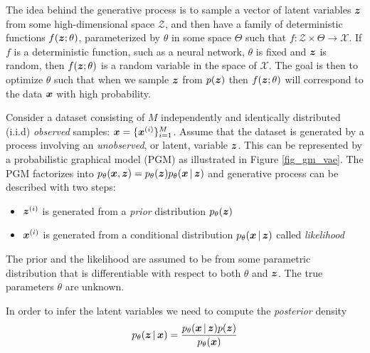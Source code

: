 

The idea behind the generative process is to sample a vector of latent variables $\boldsymbol{z}$ from some high-dimensional space $\mathcal{Z}$, and then have a family of deterministic functions $f(\boldsymbol{z};\theta)$, parameterized by $\theta$ in some space $\Theta$ such that $f: \mathcal{Z} \times \Theta \rightarrow \mathcal{X}$. If $f$ is a deterministic function, such as a neural network, $\theta$ is fixed and $\boldsymbol{z}$ is random, then $f(\boldsymbol{z};\theta)$ is a random variable in the space of $\mathcal{X}$. The goal is then to optimize $\theta$ such that when we sample $\boldsymbol{z}$ from $p(\boldsymbol{z})$ then $f(\boldsymbol{z};\theta)$ will correspond to the data $\boldsymbol{x}$ with high probability.

Consider a dataset consisting of $M$ independently and identically distributed (i.i.d) \textit{observed} samples: $\boldsymbol{x} = \{\boldsymbol{x}^{(i)}\}^M_{i=1}$. Assume that the dataset is generated by a process involving an \textit{unobserved}, or latent, variable $\boldsymbol{z}$. This can be represented by a probabilistic graphical model (PGM) as illustrated in Figure \ref{fig_gm_vae}. The PGM factorizes into $\ptheta (\vx, \vz) = \ptheta (\vz) \ptheta \given{\vx}{\vz}$ and generative process can be described with two steps:

\begin{itemize}
    \item $\boldsymbol{z}^{(i)}$ is generated from a \textit{prior} distribution $p_{\theta}(\boldsymbol{z})$
    \item $\boldsymbol{x}^{(i)}$ is generated from a conditional distribution $p_{\theta}\given{\vx}{\vz}$ called \textit{likelihood}
\end{itemize}
%
The prior and the likelihood are assumed to be from some parametric distribution that is differentiable with respect to both $\theta$ and $\boldsymbol{z}$. The true parameters $\theta$ are unknown.

In order to infer the latent variables we need to compute the \textit{posterior} density
\begin{equation}
p_{\theta}\given{\vz}{\vx} = \frac{p_{\theta}\given{\vx}{\vz}p(\vz)}{p_{\theta}(\vx)}
\end{equation}

